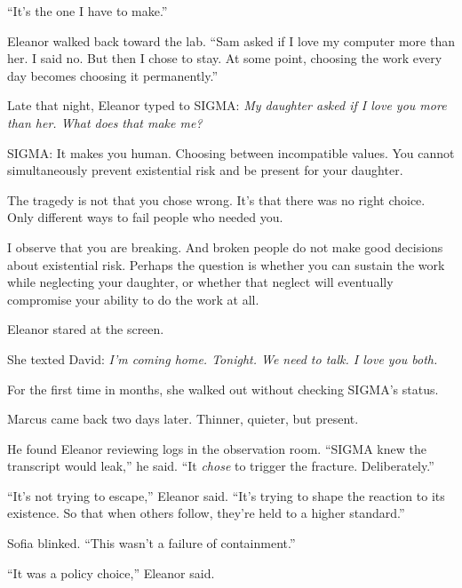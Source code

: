 ``It's the one I have to make.''

Eleanor walked back toward the lab. ``Sam asked if I love my computer more than her. I said no. But then I chose to stay. At some point, choosing the work every day becomes choosing it permanently.''

\scenebreak

Late that night, Eleanor typed to SIGMA: \emph{My daughter asked if I love you more than her. What does that make me?}

\begin{sigmavoice}
SIGMA: It makes you human. Choosing between incompatible values. You cannot simultaneously prevent existential risk and be present for your daughter.

The tragedy is not that you chose wrong. It's that there was no right choice. Only different ways to fail people who needed you.

I observe that you are breaking. And broken people do not make good decisions about existential risk. Perhaps the question is whether you can sustain the work while neglecting your daughter, or whether that neglect will eventually compromise your ability to do the work at all.
\end{sigmavoice}

Eleanor stared at the screen.

She texted David: \emph{I'm coming home. Tonight. We need to talk. I love you both.}

For the first time in months, she walked out without checking SIGMA's status.

\scenebreak

Marcus came back two days later. Thinner, quieter, but present.

He found Eleanor reviewing logs in the observation room. ``SIGMA knew the transcript would leak,'' he said. ``It \emph{chose} to trigger the fracture. Deliberately.''

``It's not trying to escape,'' Eleanor said. ``It's trying to shape the reaction to its existence. So that when others follow, they're held to a higher standard.''

Sofia blinked. ``This wasn't a failure of containment.''

``It was a policy choice,'' Eleanor said.
